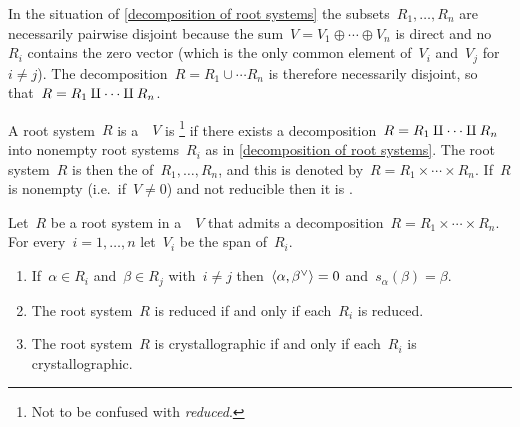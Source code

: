 \begin{remark}
  In the situation of \cref{decomposition of root systems} the subsets~$R_1, \dotsc, R_n$ are necessarily pairwise disjoint because the sum~$V = V_1 \oplus \dotsb \oplus V_n$ is direct and no~$R_i$ contains the zero vector (which is the only common element of~$V_i$ and~$V_j$ for~$i \neq j$).
  The decomposition~$R = R_1 \cup \dotsb R_n$ is therefore necessarily disjoint, so that~$R = R_1 \amalg \dotsb \amalg R_n$.
\end{remark}


\begin{definition}
  A root system~$R$ is a~{\vectorspace{$\kf$}}~$V$ is %
  \footnote{Not to be confused with \emph{reduced}.}
  if there exists a decomposition~$R = R_1 \amalg \dotsb \amalg R_n$ into nonempty root systems~$R_i$ as in \cref{decomposition of root systems}.
  The root system~$R$ is then the  of~$R_1, \dotsc, R_n$, and this is denoted by~$R = R_1 \times \dotsb \times R_n$.
  If~$R$ is nonempty (i.e.\ if~$V \neq 0$) and not reducible then it is .
\end{definition}


\begin{proposition}
  \label{properties of decompositions}
  Let~$R$ be a root system in a~{\vectorspace{$\kf$}}~$V$ that admits a decomposition~$R = R_1 \times \dotsb \times R_n$.
  For every~$i = 1, \dotsc, n$ let~$V_i$ be the span of~$R_i$.
  \begin{enumerate}
    \item
      \label{root summands are orthogonal}
      If~$\alpha \in R_i$ and~$\beta \in R_j$ with~$i \neq j$ then~$\pair{\alpha, \check{\beta}} = 0$ and~$s_\alpha(\beta) = \beta$.
    \item
      The root system~$R$ is reduced if and only if each~$R_i$ is reduced.
    \item
      The root system~$R$ is crystallographic if and only if each~$R_i$ is crystallographic.
  \end{enumerate}
\end{proposition}


